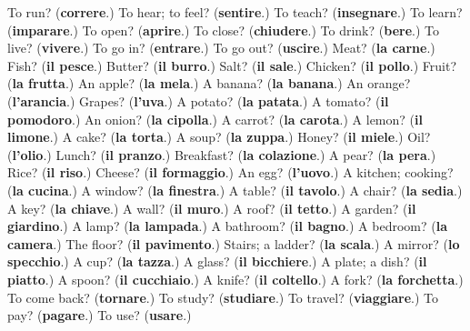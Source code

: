 \begin{tcolorbox}[breakable,colback=teal!4,colframe=teal!35!black,title={Before you move on}]
To run? (\textbf{correre}.) To hear; to feel? (\textbf{sentire}.) To teach? (\textbf{insegnare}.) To learn? (\textbf{imparare}.) To open? (\textbf{aprire}.) To close? (\textbf{chiudere}.) To drink? (\textbf{bere}.) To live? (\textbf{vivere}.) To go in? (\textbf{entrare}.) To go out? (\textbf{uscire}.) Meat? (\textbf{la carne}.) Fish? (\textbf{il pesce}.) Butter? (\textbf{il burro}.) Salt? (\textbf{il sale}.) Chicken? (\textbf{il pollo}.) Fruit? (\textbf{la frutta}.) An apple? (\textbf{la mela}.) A banana? (\textbf{la banana}.) An orange? (\textbf{l'arancia}.) Grapes? (\textbf{l'uva}.) A potato? (\textbf{la patata}.) A tomato? (\textbf{il pomodoro}.) An onion? (\textbf{la cipolla}.) A carrot? (\textbf{la carota}.) A lemon? (\textbf{il limone}.) A cake? (\textbf{la torta}.) A soup? (\textbf{la zuppa}.) Honey? (\textbf{il miele}.) Oil? (\textbf{l'olio}.) Lunch? (\textbf{il pranzo}.) Breakfast? (\textbf{la colazione}.) A pear? (\textbf{la pera}.) Rice? (\textbf{il riso}.) Cheese? (\textbf{il formaggio}.) An egg? (\textbf{l'uovo}.) A kitchen; cooking? (\textbf{la cucina}.) A window? (\textbf{la finestra}.) A table? (\textbf{il tavolo}.) A chair? (\textbf{la sedia}.) A key? (\textbf{la chiave}.) A wall? (\textbf{il muro}.) A roof? (\textbf{il tetto}.) A garden? (\textbf{il giardino}.) A lamp? (\textbf{la lampada}.) A bathroom? (\textbf{il bagno}.) A bedroom? (\textbf{la camera}.) The floor? (\textbf{il pavimento}.) Stairs; a ladder? (\textbf{la scala}.) A mirror? (\textbf{lo specchio}.) A cup? (\textbf{la tazza}.) A glass? (\textbf{il bicchiere}.) A plate; a dish? (\textbf{il piatto}.) A spoon? (\textbf{il cucchiaio}.) A knife? (\textbf{il coltello}.) A fork? (\textbf{la forchetta}.) To come back? (\textbf{tornare}.) To study? (\textbf{studiare}.) To travel? (\textbf{viaggiare}.) To pay? (\textbf{pagare}.) To use? (\textbf{usare}.)
\end{tcolorbox}
